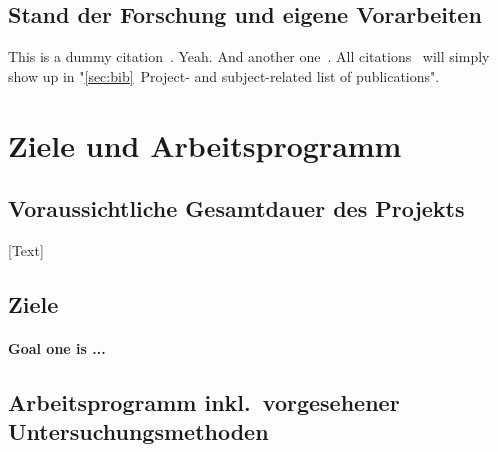 \documentclass[ngerman]{scrartcl}
\begin{document}
\subsection*{Stand der Forschung und eigene Vorarbeiten}

This is a dummy citation~\citep{lamkiewicz2024ribap}. Yeah. And another one~\citep{assmann2025augmentation}. All citations~\citep{fuchs2025varvamp,galeone2025decoding,raharinirina2025sars} will simply show up in "\ref{sec:bib}~Project- and subject-related list of publications".

\lipsum[1]

\section{Ziele und Arbeitsprogramm}

\subsection{Voraussichtliche Gesamtdauer des Projekts}
[Text]

\subsection{Ziele}
\let\oldpara=\theparagraph
\addtocounter{secnumdepth}{1}
\renewcommand{\theparagraph}{Ziel \arabic{paragraph}}

\paragraph{\textnormal{Goal one is ...}}

\subsection{Arbeitsprogramm inkl.\ vorgesehener Untersuchungsmethoden}
\end{document}
